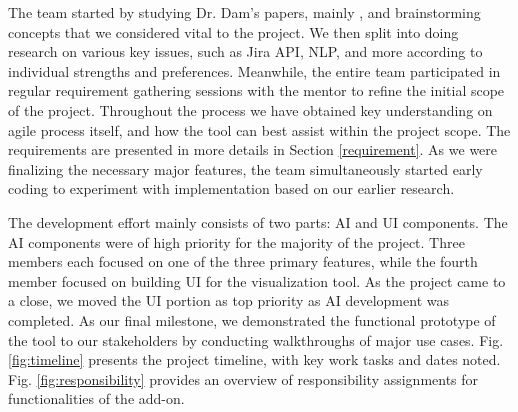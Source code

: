 The team started by studying Dr. Dam's papers, mainly \cite{dam1}, and brainstorming concepts that we considered vital to the project. We then split into doing research on various key issues, such as Jira API, NLP, and more according to individual strengths and preferences. Meanwhile, the entire team participated in regular requirement gathering sessions with the mentor to refine the initial scope of the project. Throughout the process we have obtained key understanding on agile process itself, and how the tool can best assist within the project scope. The requirements are presented in more details in Section \ref{requirement}. As we were finalizing the necessary major features, the team simultaneously started early coding to experiment with implementation based on our earlier research. 

The development effort mainly consists of two parts: AI and UI components.  The AI components were of high priority for the majority of the project. Three members each focused on one of the three primary features, while the fourth member focused on building UI for the visualization tool. As the project came to a close, we moved the UI portion as top priority as AI development was completed. As our final milestone, we demonstrated the functional prototype of the tool to our stakeholders by conducting walkthroughs of major use cases. Fig. \ref{fig:timeline} presents the project timeline, with key work tasks and dates noted. Fig. \ref{fig:responsibility} provides an overview of responsibility assignments for functionalities of the add-on.

